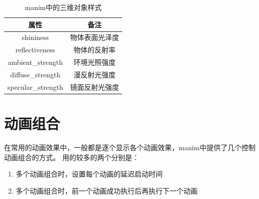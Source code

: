 \begin{table}[htpb]
\begin{tabular}{c|c}
属性                  & 备注                                \\ \hline
shininess             & 物体表面光泽度                       \\
reflectiveness        & 物体的反射率                        \\
ambient\_strength     & 环境光照强度                         \\
diffuse\_strength     & 漫反射光强度                         \\
specular\_strength    & 镜面反射光强度                       \\
\end{tabular}
\caption{manim中的三维对象样式}
\label{tab:manim中的三维对象样式}
\end{table}



\section{动画组合}
\label{sec:manim_animation_group}
在常用的动画效果中，一般都是逐个显示各个动画效果，manim中提供了几个控制动画组合的方式。 用的较多的两个分别是：

\begin{enumerate}[label=\arabic*)]
    \item 多个动画组合时，设置每个动画的延迟启动时间
    \item 多个动画组合时，前一个动画成功执行后再执行下一个动画
\end{enumerate}

